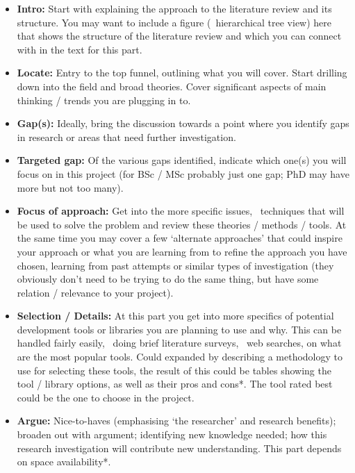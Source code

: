 \begin{itemize}
  \item \textbf{Intro:} Start with explaining the approach to the literature review and its structure. You may want to include a figure (\eg~hierarchical tree view) here that shows the structure of the literature review and which you can connect with in the text for this part.
  
  \item \textbf{Locate:} Entry to the top funnel, outlining what you will cover. Start drilling down into the field and broad theories. Cover significant aspects of main thinking / trends you are plugging in to.
  
  \item \textbf{Gap(s):} Ideally, bring the discussion towards a point where you identify gaps in research or areas that need further investigation.
  
  \item \textbf{Targeted gap:} Of the various gaps identified, indicate which one(s) you will focus on in this project (for BSc / MSc probably just one gap; PhD may have more but not too many).
  
  \item \textbf{Focus of approach:} Get into the more specific issues, \ie~techniques that will be used to solve the problem and review these theories / methods / tools.
  At the same time you may cover a few `alternate approaches' that could inspire your approach or what you are learning from to refine the approach you have chosen, learning from past attempts or similar types of investigation (they obviously don't need to be trying to do the same thing, but have some relation / relevance to your project).
  
  \item \textbf{Selection / Details:} At this part you get into more specifics of potential development tools or libraries you are planning to use and why.
  This can be handled fairly easily, \eg~doing brief literature surveys, \eg~web searches, on what are the most popular tools. Could expanded by describing a methodology to use for selecting these tools, the result of this could be tables showing the tool / library options, as well as their pros and cons*.  The tool rated best could be the one to choose in the project.
  
  \item \textbf{Argue:} Nice-to-haves (emphasising `the researcher' and research benefits); broaden out with argument; identifying new knowledge needed; how this research investigation will contribute new understanding. This part depends on space availability*.
  

\end{itemize}
